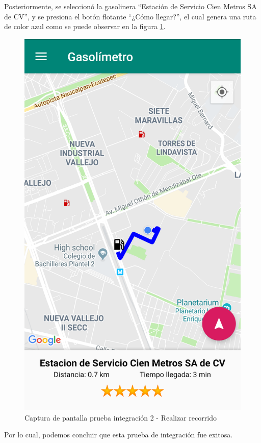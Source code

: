 Posteriormente, se seleccionó la gasolinera ``Estación de Servicio Cien Metros SA de CV'', y se presiona el botón flotante ``¿Cómo llegar?'', el cual genera una ruta de color azul como se puede observar en la figura \ref{fig:int12}.


\begin{figure}[H]
	\centering
	\includegraphics[scale=.2]{DocumentoTecnico/Capitulo6/integracion/Software/images/12.png}
	\caption{Captura de pantalla prueba integración 2 - Realizar recorrido}
	\label{fig:int12}
\end{figure}

Por lo cual, podemos concluir que esta prueba de integración fue exitosa.